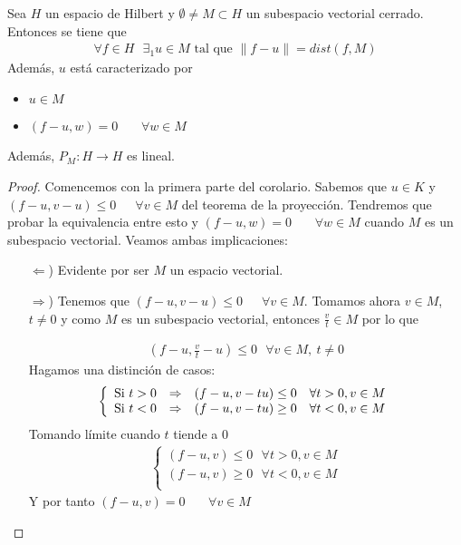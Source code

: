\begin{coro}
    Sea $H$ un espacio de Hilbert y $\emptyset \neq M \subset H$ un subespacio vectorial cerrado. Entonces se tiene que 
    \begin{gather*}
        \forall f \in H \ \ \ \exists_1u\in M \text{ tal que } \|f-u\| = dist(f,M)
    \end{gather*}
    Además, $u$ está caracterizado por
    \begin{itemize}
        \item $u\in M$
        \item $(f-u, w) = 0$ \ \ \ $\forall w \in M$
    \end{itemize}

    Además, $P_M:H \to H$ es lineal.
    \begin{proof}
        Comencemos con la primera parte del corolario. Sabemos que $u\in K$ y $(f-u, v-u)\leq 0$\ \ \ $\forall v \in M$ del teorema de la proyección. Tendremos que probar la equivalencia entre esto y $(f-u, w) = 0$ \ \ \ $\forall w \in M$ cuando $M$ es un subespacio vectorial. Veamos ambas implicaciones:
        \begin{itemize}
            \item[$\Leftarrow$)] Evidente por ser $M$ un espacio vectorial.
            \item[$\Rightarrow$)] Tenemos que $(f-u, v-u)\leq 0$\ \ \ $\forall v \in M$. Tomamos ahora $v\in M$, $t\neq 0$ y como $M$ es un subespacio vectorial, entonces $\frac{v}{t}\in M$ por lo que
            
            \begin{gather*}
                (f-u, \frac{v}{t}-u) \leq 0 \ \ \ \forall v\in M, \ t\neq 0
            \end{gather*}
            Hagamos una distinción de casos:
            \begin{gather*}
                \left\{
                    \begin{array}{c c c}
                        \text{Si } t>0 & \Rightarrow  &(f-u,v-tu) \leq 0 \ \ \ \forall t>0, v\in M\\
                        \text{Si } t<0 & \Rightarrow  &(f-u,v-tu) \geq 0 \ \ \ \forall t<0, v\in M\\
                    \end{array}
                \right.
            \end{gather*}
            Tomando límite cuando $t$ tiende a $0$
            \begin{gather*}
                \left\{
                    \begin{array}{c}
                        (f-u,v) \leq 0 \ \ \ \forall t>0, v\in M\\
                        (f-u,v) \geq 0 \ \ \ \forall t<0, v\in M\\
                    \end{array}
                \right.
            \end{gather*}
            Y por tanto $(f-u,v) = 0$ \ \ \ $\forall v\in M$
        \end{itemize}


\end{proof}
\end{coro}
